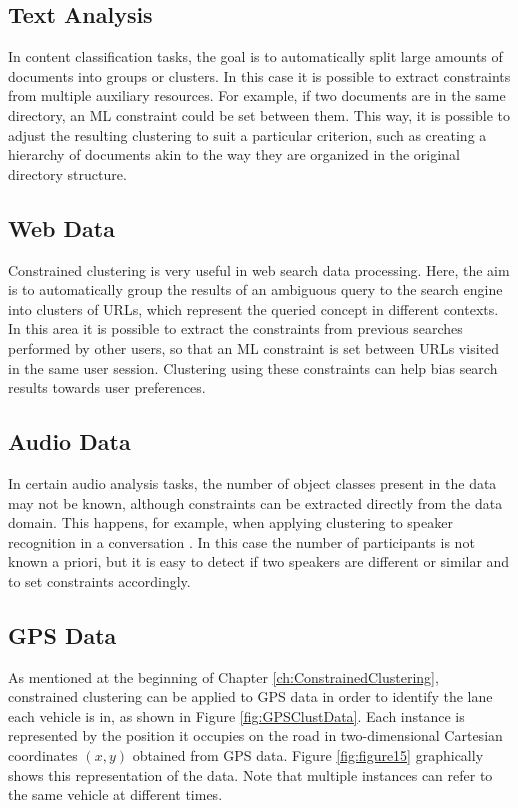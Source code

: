\subsection{Text Analysis}

In content classification tasks, the goal is to automatically split large amounts of documents into groups or clusters. In this case it is possible to extract constraints from multiple auxiliary resources. For example, if two documents are in the same directory, an \acs{ML} constraint could be set between them. This way, it is possible to adjust the resulting clustering to suit a particular criterion, such as creating a hierarchy of documents akin to the way they are organized in the original directory structure.

\subsection{Web Data} 

Constrained clustering is very useful in web search data processing. Here, the aim is to automatically group the results of an ambiguous query to the search engine into clusters of \acsp{URL}, which represent the queried concept in different contexts. In this area it is possible to extract the constraints from previous searches performed by other users, so that an \acs{ML} constraint is set between \acsp{URL} visited in the same user session. Clustering using these constraints can help bias search results towards user preferences.

\subsection{Audio Data}

In certain audio analysis tasks, the number of object classes present in the data may not be known, although constraints can be extracted directly from the data domain. This happens, for example, when applying clustering to speaker recognition in a conversation \cite{bar2003learning}. In this case the number of participants is not known a priori, but it is easy to detect if two speakers are different or similar and to set constraints accordingly.

\subsection[\acsfont{GPS} Data]{GPS Data} \label{sec:GPSApp}

As mentioned at the beginning of Chapter \ref{ch:ConstrainedClustering}, constrained clustering can be applied to \acs{GPS} data in order to identify the lane each vehicle is in, as shown in Figure \ref{fig:GPSClustData}. Each instance is represented by the position it occupies on the road in two-dimensional Cartesian coordinates $(x,y)$ obtained from \acs{GPS} data. Figure \ref{fig:figure15} graphically shows this representation of the data. Note that multiple instances can refer to the same vehicle at different times.

